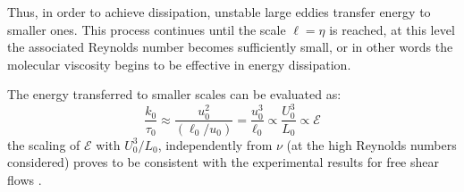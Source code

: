 \documentclass[12pt, a4paper, twoside, openright]{book}
\begin{document}
Thus, in order to achieve dissipation, unstable large eddies transfer energy to smaller ones. This process continues until the scale $\ell = \eta$ is reached, at this level the associated Reynolds number becomes sufficiently small, or in other words the molecular viscosity begins to be effective in energy dissipation.

The energy transferred to smaller scales can be evaluated as:
\begin{equation}
	\frac{k_0}{\tau_0} \approx \frac{u_0^2}{\left( \ell_0 / u_0\right)} = \frac{u_0^3}{\ell_0} \propto \frac{U_0^3}{L_0} \propto \mathcal{E}
\end{equation}
the scaling of $\mathcal{E}$ with $U_0^3 / L_0$, independently from $\nu$ (at the high Reynolds numbers considered) proves to be consistent with the experimental results for free shear flows \cite{turbulent-flows}.
\end{document}
